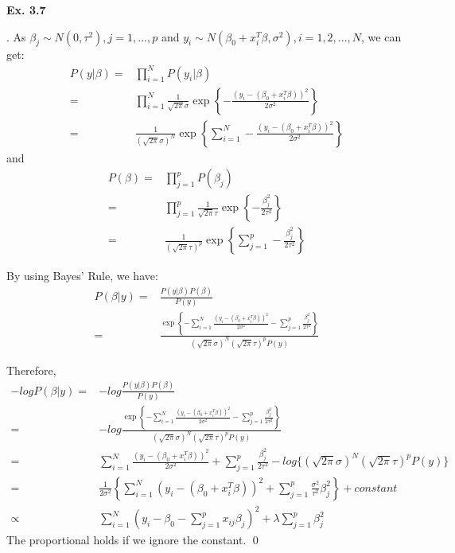 \documentclass[12pt]{article}
\newenvironment{sol}
  {\par\vspace{3mm}\noindent{\it Solution}.}
  {\qed}
\begin{document}
\begin{flushleft}
\textbf{Ex. 3.7}
\end{flushleft}

\begin{sol}
As $\beta_j \sim N(0,\tau^2 ), j=1,...,p$ and $y_i \sim N(\beta_0+x_i^T \beta,\sigma^2), i=1,2,...,N$, we can get:
\begin{equation}
\nonumber
\begin{split}
P\left( {y|\beta} \right) =& \prod_{i = 1}^N P\left( {{y_i}|\beta } \right) \\
=& \prod_{i = 1}^N \frac{1}{\sqrt{2\pi}\sigma}\exp\left\{-\frac{(y_i-(\beta _0+x_i^T\beta))^2}{2\sigma ^2}\right\} \\
=& \frac{1}{(\sqrt{2\pi}\sigma)^N}\exp\left\{\sum_{i = 1}^{N}-\frac{(y_i-(\beta _0+x_i^T\beta))^2}{2\sigma ^2}\right\}
\end{split}
\end{equation}
and
\begin{equation}
\nonumber
\begin{split}
P\left(\beta\right) =& \prod_{j = 1}^p P(\beta_j) \\
=& \prod_{j=1}^p \frac{1}{\sqrt{2\pi}\tau}\exp\left\{-\frac{\beta_j^2}{2\tau^2}\right\} \\
=& \frac{1}{(\sqrt{2\pi}\tau)^{p}}\exp\left\{\sum_{j=1}^{p}-\frac{\beta_j^2}{2\tau^2}\right\}
\end{split}
\end{equation}

By using Bayes’ Rule, we have:
\begin{equation}
\nonumber
\begin{split}
P(\beta|y) =& \frac{P(y|\beta)P(\beta)}{P(y)} \\
=& \frac{\exp\left\{-\sum_{i=1}^{N}\frac{(y_{i}-(\beta_0+x_i^T\beta))^2}{2\sigma^2} - \sum_{j=1}^p\frac{\beta_j^2}{2\tau^2}\right\}}{(\sqrt{2\pi}\sigma)^{N}(\sqrt{2\pi}\tau)^{p}P(y)}
\end{split}
\end{equation}

Therefore,
\begin{equation}
\nonumber
\begin{split}
-logP(\beta|y) =& -log\frac{P(y|\beta)P(\beta)}{P(y)} \\
=& -log\frac{\exp\left\{-\sum_{i=1}^{N}\frac{(y_{i}-(\beta_0+x_i^T\beta))^2}{2\sigma^2} -\sum_{j=1}^p\frac{\beta_j^2}{2\tau^2}\right\}}{(\sqrt{2\pi}\sigma)^{N}(\sqrt{2\pi}\tau)^{p}P(y)}\\
=& \sum_{i=1}^{N}\frac{(y_{i}-(\beta_0+x_i^T\beta))^2}{2\sigma^2} + \sum_{j=1}^p\frac{\beta_j^2}{2\tau^2} - log\{(\sqrt{2\pi}\sigma)^{N}(\sqrt{2\pi}\tau)^{p}P(y)\}\\
=& \frac{1}{2\sigma^2}\left\{\sum_{i = 1}^N(y_i-(\beta _0 + x_i^T\beta))^2 +\sum_{j = 1}^p \frac{\sigma ^2}{\tau ^2}\beta _j^2\right\} + constant\\
\propto& \sum_{i = 1}^N(y_i - \beta _0 - \sum_{j = 1}^{p}x_{ij}\beta _j)^2 + \lambda \sum_{j = 1}^p \beta _j^2
\end{split}
\end{equation}
The proportional holds if we ignore the constant.
\end{sol}
\end{document}
